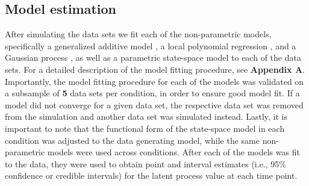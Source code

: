 
\subsection{Model estimation}

After simulating the data sets we fit each of the non-parametric models,
specifically a generalized additive model \parencite{wood_generalized_2006},
a local polynomial regression \parencite{fan_local_1997}, and
a Gaussian process \parencite{rasmussen_gaussian_2006},
as well as a parametric state-space model \parencite{durbin_time_2012} to each
of the data sets. For a detailed description of the model fitting procedure,
see \textbf{Appendix A}. Importantly, the model fitting procedure for each of
the models was validated on a subsample of \textbf{5} data sets per condition,
in order to ensure good model fit. If a model did not
converge for a given data set, the respective data set was removed from the
simulation and another data set was simulated instead. Lastly, it is important
to note that the functional form of the state-space model in each condition
was adjusted to the data generating model, while the same
non-parametric models were used across conditions. After each of the
models was fit to the data, they were used to obtain point and interval
estimates (i.e., 95\% confidence or credible intervals) for the
latent process value at each time point.